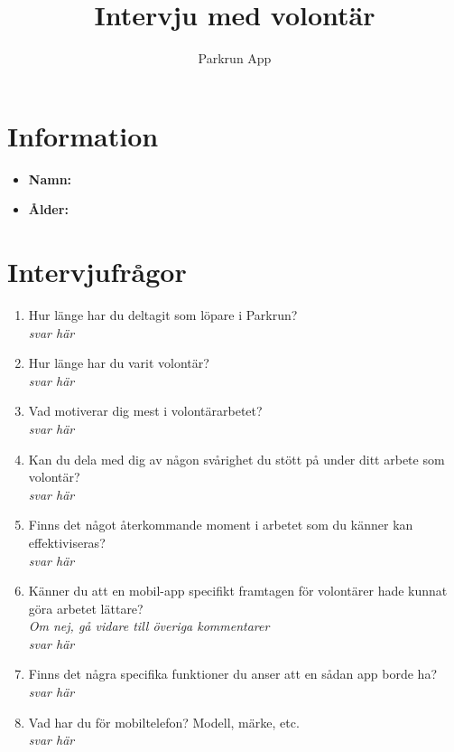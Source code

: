 \documentclass{article}
\title{\textbf{Intervju med volontär}}
\author{Parkrun App}
\date{}
\begin{document}
\maketitle
\thispagestyle{empty}
\section*{Information}
\begin{itemize}[label=]
    \item \textbf{Namn:} 
    \item \textbf{Ålder:} 
\end{itemize}

\section*{Intervjufrågor}
\begin{enumerate}[label=\textbf{Fråga \arabic*:}]
    \item Hur länge har du deltagit som löpare i Parkrun?\\
        \textit{svar här}
    \item Hur länge har du varit volontär?\\
        \textit{svar här}
    \item Vad motiverar dig mest i volontärarbetet?\\
        \textit{svar här}
    \item Kan du dela med dig av någon svårighet du stött på under ditt arbete som volontär?\\
        \textit{svar här}
    \item Finns det något återkommande moment i arbetet som du känner kan effektiviseras?\\
        \textit{svar här}
    \item Känner du att en mobil-app specifikt framtagen för volontärer hade kunnat göra arbetet lättare?\\
    \textit{Om nej, gå vidare till överiga kommentarer}\\
        \textit{svar här}
    \item Finns det några specifika funktioner du anser att en sådan app borde ha?\\
        \textit{svar här}
    \item Vad har du för mobiltelefon? Modell, märke, etc.\\
        \textit{svar här}
\end{enumerate}

\newpage
\end{document}
